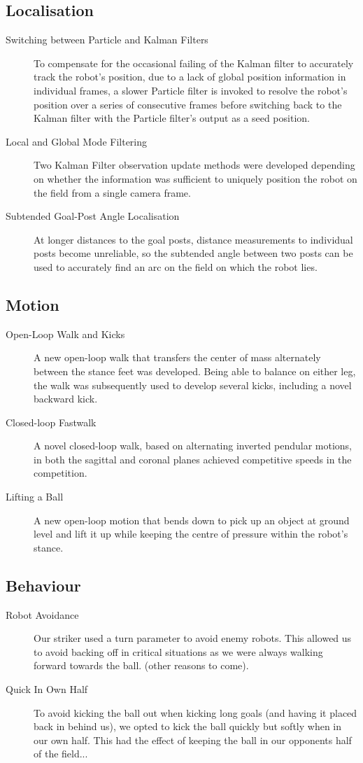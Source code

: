 \documentclass[pdftex,11pt,a4paper]{report}
\begin{document}
\subsection{Localisation}
\begin{description}
\item[Switching between Particle and Kalman Filters] To compensate for the occasional failing of the Kalman filter to accurately track the robot's position, due to a lack of global position information in individual frames, a slower Particle filter is invoked to resolve the robot's position over a series of consecutive frames before switching back to the Kalman filter with the Particle filter's output as a seed position.
\item[Local and Global Mode Filtering] Two Kalman Filter observation update methods were developed depending on whether the information was sufficient to uniquely position the robot on the field from a single camera frame.
\item[Subtended Goal-Post Angle Localisation] At longer distances to the goal posts, distance measurements to individual posts become unreliable, so the subtended angle between two posts can be used to accurately find an arc on the field on which the robot lies.
\end{description}
\subsection{Motion}
\begin{description}
\item[Open-Loop Walk and Kicks] A new open-loop walk that transfers the center of mass alternately between the stance feet was developed. Being able to balance on either leg, the walk was subsequently used to develop several kicks, including a novel backward kick.
\item[Closed-loop Fastwalk] A novel closed-loop walk, based on alternating inverted pendular motions, in both the sagittal and coronal planes achieved competitive speeds in the competition.
\item[Lifting a Ball] A new open-loop motion that bends down to pick up an
   object at ground level and lift it up while keeping the centre of
   pressure within the robot's stance.
\end{description}
\subsection{Behaviour}
\begin{description}
\item[Robot Avoidance] Our striker used a turn parameter to avoid enemy robots. This allowed us to avoid backing off in critical situations as we were always walking forward towards the ball. (other reasons to come).
\item[Quick In Own Half] To avoid kicking the ball out when kicking long goals (and having it placed back in behind us), we opted to kick the ball quickly but softly when in our own half. This had the effect of keeping the ball in our opponents half of the field...
\end{description}
\end{document}
